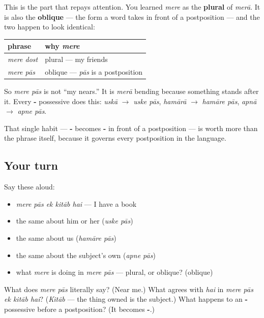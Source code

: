 \begin{grammarlens}[title={Grammar Lens: mere is not the plural here}]
This is the part that repays attention. You learned \emph{mere} as the \textbf{plural} of \emph{merā}. It is also the \textbf{oblique} — the form a word takes in front of a postposition — and the two happen to look identical:

\noindent
\begin{tabularx}{\linewidth}{@{}>{\raggedright\arraybackslash}X>{\raggedright\arraybackslash}X@{}}
\toprule
\textbf{phrase} & \textbf{why \emph{mere}} \\
\midrule
\emph{mere dost} & plural — my friends \\
\emph{mere pās} & oblique — \emph{pās} is a postposition \\
\bottomrule
\end{tabularx}

So \emph{mere pās} is not \textquotedblleft{}my nears.\textquotedblright{} It is \emph{merā} bending because something stands after it. Every \textbf{-} possessive does this: \emph{uskā} $\to$ \emph{uske pās}, \emph{hamārā} $\to$ \emph{hamāre pās}, \emph{apnā} $\to$ \emph{apne pās}.

That single habit — \textbf{-} becomes \textbf{-} in front of a postposition — is worth more than the phrase itself, because it governs every postposition in the language.
\end{grammarlens}

\subsection*{Your turn}
Say these aloud:

\begin{itemize}
\raggedright
  \item \emph{mere pās ek kitāb hai} — I have a book
  \item the same about him or her (\emph{uske pās})
  \item the same about us (\emph{hamāre pās})
  \item the same about the subject's own (\emph{apne pās})
  \item what \emph{mere} is doing in \emph{mere pās} — plural, or oblique? (oblique)
\end{itemize}

\begin{tcolorbox}[breakable,colback=teal!4,colframe=teal!35!black,title={Before you move on}]
What does \emph{mere pās} literally say? (Near me.) What agrees with \emph{hai} in \emph{mere pās ek kitāb hai}? (\emph{Kitāb} — the thing owned is the subject.) What happens to an \textbf{-} possessive before a postposition? (It becomes \textbf{-}.)
\end{tcolorbox}
